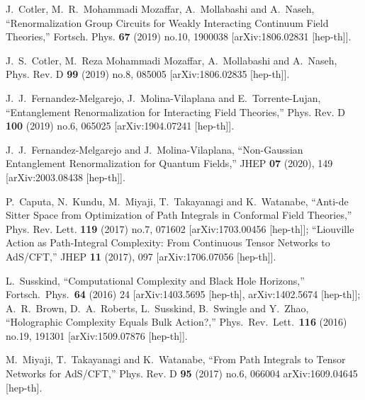 \documentclass[a4paper,12pt]{article}
\begin{document}
\begin{thebibliography}{}
J.~Cotler, M.~R.~Mohammadi Mozaffar, A.~Mollabashi and A.~Naseh,
``Renormalization Group Circuits for Weakly Interacting Continuum Field Theories,''
Fortsch. Phys. \textbf{67} (2019) no.10, 1900038
[arXiv:1806.02831 [hep-th]].

J.~S.~Cotler, M.~Reza Mohammadi Mozaffar, A.~Mollabashi and A.~Naseh,
Phys. Rev. D \textbf{99} (2019) no.8, 085005
[arXiv:1806.02835 [hep-th]].

J.~J.~Fernandez-Melgarejo, J.~Molina-Vilaplana and E.~Torrente-Lujan,
``Entanglement Renormalization for Interacting Field Theories,''
Phys. Rev. D \textbf{100} (2019) no.6, 065025
[arXiv:1904.07241 [hep-th]].

J.~J.~Fernandez-Melgarejo and J.~Molina-Vilaplana,
``Non-Gaussian Entanglement Renormalization for Quantum Fields,''
JHEP \textbf{07} (2020), 149
[arXiv:2003.08438 [hep-th]].




P.~Caputa, N.~Kundu, M.~Miyaji, T.~Takayanagi and K.~Watanabe,
``Anti-de Sitter Space from Optimization of Path Integrals in Conformal Field Theories,''
Phys. Rev. Lett. \textbf{119} (2017) no.7, 071602
[arXiv:1703.00456 [hep-th]];
``Liouville Action as Path-Integral Complexity: From Continuous Tensor Networks to AdS/CFT,''
JHEP \textbf{11} (2017), 097
[arXiv:1706.07056 [hep-th]].

  L.~Susskind,
  ``Computational Complexity and Black Hole Horizons,''
  Fortsch.\ Phys.\  {\bf 64} (2016) 24
  [arXiv:1403.5695 [hep-th], arXiv:1402.5674 [hep-th]];
  A.~R.~Brown, D.~A.~Roberts, L.~Susskind, B.~Swingle and Y.~Zhao,
  ``Holographic Complexity Equals Bulk Action?,''
  Phys.\ Rev.\ Lett.\  {\bf 116} (2016) no.19,  191301
  [arXiv:1509.07876 [hep-th]].

  M.~Miyaji, T.~Takayanagi and K.~Watanabe,
  ``From Path Integrals to Tensor Networks for AdS/CFT,''  
 Phys. Rev. D \textbf{95} (2017) no.6, 066004
arXiv:1609.04645 [hep-th].


\end{thebibliography}
\end{document}
